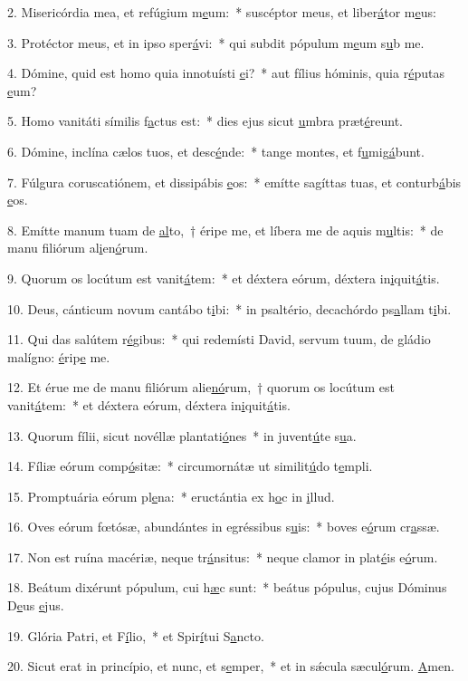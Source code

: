 2. Misericórdia mea, et refúgium m\uline{e}um:~* suscéptor meus, et liber\uline{á}tor m\uline{e}us:\par 
3. Protéctor meus, et in ipso sper\uline{á}vi:~* qui subdit pópulum m\uline{e}um s\uline{u}b me.\par 
4. Dómine, quid est homo quia innotuísti \uline{e}i?~* aut fílius hóminis, quia r\uline{é}putas \uline{e}um?\par 
5. Homo vanitáti símilis f\uline{a}ctus est:~* dies ejus sicut \uline{u}mbra præt\uline{é}reunt.\par 
6. Dómine, inclína cælos tuos, et desc\uline{é}nde:~* tange montes, et f\uline{u}mig\uline{á}bunt.\par 
7. Fúlgura coruscatiónem, et dissipábis \uline{e}os:~* emítte sagíttas tuas, et conturb\uline{á}bis \uline{e}os.\par 
8. Emítte manum tuam de \uline{al}to,~† éripe me, et líbera me de aquis m\uline{u}ltis:~* de manu filiórum al\uline{i}en\uline{ó}rum.\par 
9. Quorum os locútum est vanit\uline{á}tem:~* et déxtera eórum, déxtera in\uline{i}quit\uline{á}tis.\par 
10. Deus, cánticum novum cantábo t\uline{i}bi:~* in psaltério, decachórdo ps\uline{a}llam t\uline{i}bi.\par 
11. Qui das salútem r\uline{é}gibus:~* qui redemísti David, servum tuum, de gládio malígno: \uline{é}rip\uline{e} me.\par 
12. Et érue me de manu filiórum alie\uline{nó}rum,~† quorum os locútum est vanit\uline{á}tem:~* et déxtera eórum, déxtera in\uline{i}quit\uline{á}tis.\par 
13. Quorum fílii, sicut novéllæ plantati\uline{ó}nes~* in juvent\uline{ú}te s\uline{u}a.\par 
14. Fíliæ eórum comp\uline{ó}sitæ:~* circumornátæ ut similit\uline{ú}do t\uline{e}mpli.\par 
15. Promptuária eórum pl\uline{e}na:~* eructántia ex h\uline{o}c in \uline{i}llud.\par 
16. Oves eórum fœtósæ, abundántes in egréssibus s\uline{u}is:~* boves e\uline{ó}rum cr\uline{a}ssæ.\par 
17. Non est ruína macériæ, neque tr\uline{á}nsitus:~* neque clamor in plat\uline{é}is e\uline{ó}rum.\par 
18. Beátum dixérunt pópulum, cui h\uline{æ}c sunt:~* beátus pópulus, cujus Dóminus D\uline{e}us \uline{e}jus.\par 
19. Glória Patri, et F\uline{í}lio,~* et Spir\uline{í}tui S\uline{a}ncto.\par 
20. Sicut erat in princípio, et nunc, et s\uline{e}mper,~* et in sǽcula sæcul\uline{ó}rum. \uline{A}men.\par 
